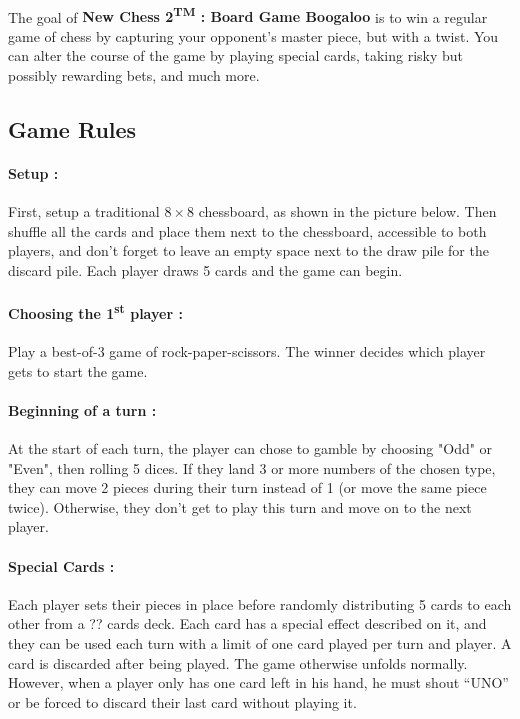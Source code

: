 \documentclass[12pt]{article}
\begin{document}
            \paragraph{}
                The goal of \textbf{New Chess 2\textsuperscript{TM} : Board Game Boogaloo} is to win a regular game of chess by capturing your opponent's master piece, but with a twist. You can alter the course of the game by playing special cards, taking risky but possibly rewarding bets, and much more.
                
                
        \subsection{Game Rules}
            \paragraph{Setup :\\}
                First, setup a traditional $8\times8$ chessboard, as shown in the picture below. Then shuffle all the cards and place them next to the chessboard, accessible to both players, and don't forget to leave an empty space next to the draw pile for the discard pile. Each player draws 5 cards and the game can begin.
                
            \paragraph{Choosing the 1\textsuperscript{st} player :\\}
                Play a best-of-3 game of rock-paper-scissors. The winner decides which player gets to start the game.
                
            \paragraph{Beginning of a turn :\\}
                At the start of each turn, the player can chose to gamble by choosing "Odd" or "Even", then rolling 5 dices. If they land 3 or more numbers of the chosen type, they can move 2 pieces during their turn instead of 1 (or move the same piece twice). Otherwise, they don't get to play this turn and move on to the next player.
            
            \paragraph{Special Cards :\\}
            Each player sets their pieces in place before randomly distributing 5 cards to each other from a ?? cards deck. Each card has a special effect described on it, and they can be used each turn with a limit of one card played per turn and player. A card is discarded after being played.
            The game otherwise unfolds normally. However, when a player only has one card left in his hand, he must shout “UNO” or be forced to discard their last card without playing it.
            
\end{document}

